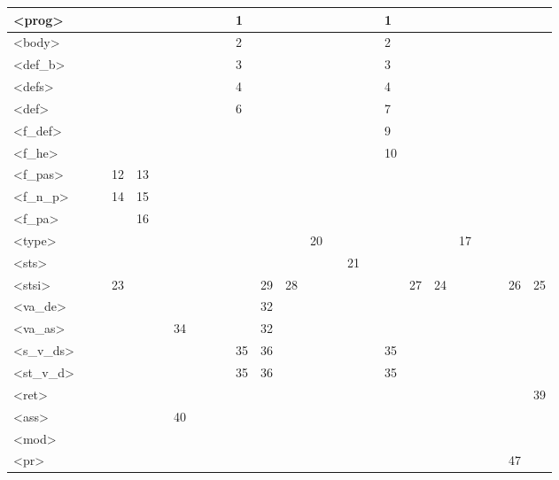 \begin{normalsize}
\begin{enumerate}
\begin{landscape}
\begin{table}[htbp]
\begin{tabular}{|l|l|l|l|l|l|l|l|l|l|l|l|l|l|l|l|l|l|l|l|l|l|l|l|l|}
                    <prog>&&&&&&&&&&1&&&&&&&1&&&&&&&
                    \\ \hline
                    <body>&&&&&&&&&&2&&&&&&&2&&&&&&&
                    \\ \hline
                    <def\_b>&&&&&&&&&&3&&&&&&&3&&&&&&&
                    \\ \hline
                    <defs>&&&&&&&&&&4&&&&&&&4&&&&&&&
                    \\ \hline
                    <def>&&&&&&&&&&6&&&&&&&7&&&&&&&
                    \\ \hline
                    <f\_def>&&&&&&&&&&&&&&&&&9&&&&&&&
                    \\ \hline
                    <f\_he>&&&&&&&&&&&&&&&&&10&&&&&&&
                    \\ \hline
                    <f\_pas>&&&12&13&&&&&&&&&&&&&&&&&&&&
                    \\ \hline
                    <f\_n\_p>&&&14&15&&&&&&&&&&&&&&&&&&&&
                    \\ \hline
                    <f\_pa>&&&&16&&&&&&&&&&&&&&&&&&&&
                    \\ \hline
                    <type>&&&&&&&&&&&&&20&&&&&&&17&&&&
                    \\ \hline
                    <sts>&&&&&&&&&&&&&&&21&&&&&&&&&
                    \\ \hline
                    <stsi>&&&23&&&&&&&&29&28&&&&&&27&24&&&&26&25
                    \\ \hline
                    <va\_de>&&&&&&&&&&&32&&&&&&&&&&&&&
                    \\ \hline
                    <va\_as>&&&&&&34&&&&&32&&&&&&&&&&&&&
                    \\ \hline
                    <s\_v\_ds>&&&&&&&&&&35&36&&&&&&35&&&&&&&
                    \\ \hline
                    <st\_v\_d>&&&&&&&&&&35&36&&&&&&35&&&&&&&
                    \\ \hline
                    <ret>&&&&&&&&&&&&&&&&&&&&&&&&39
                    \\ \hline
                    <ass>&&&&&&40&&&&&&&&&&&&&&&&&&
                    \\ \hline
                    <mod>&&&&&&&&&&&&&&&&&&&&&&&&
                    \\ \hline
                    <pr>&&&&&&&&&&&&&&&&&&&&&&&47&
                    \\ \hline

\end{tabular}
\end{table}
\end{landscape}
\end{enumerate}
\end{normalsize}
